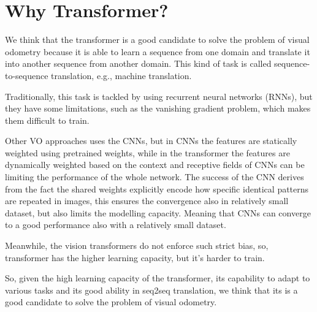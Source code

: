 \section{Why Transformer?}\label{sec:why-transformer}

We think that the transformer is a good candidate to solve the problem of visual odometry because it is able to learn a sequence from one domain and translate it into another sequence from another domain.
This kind of task is called sequence-to-sequence translation, e.g., machine translation.

Traditionally, this task is tackled by using recurrent neural networks (RNNs), but they have some limitations, such as the vanishing gradient problem, which makes them difficult to train.

Other VO approaches uses the CNNs, but in CNNs the features are statically weighted using pretrained weights, while in the transformer the features are dynamically weighted based on the context and receptive fields of CNNs can be limiting the performance of the whole network.
The success of the CNN derives from the fact the shared weights explicitly encode how specific identical patterns are repeated in images, this ensures the convergence also in relatively small dataset, but also limits the modelling capacity.
Meaning that CNNs can converge to a good performance also with a relatively small dataset.

Meanwhile, the vision transformers do not enforce such strict bias, so, transformer has the higher learning capacity, but it's harder to train.

So, given the high learning capacity of the transformer, its capability to adapt to various tasks and its good ability in seq2seq translation, we think that its is a good candidate to solve the problem of visual odometry.
